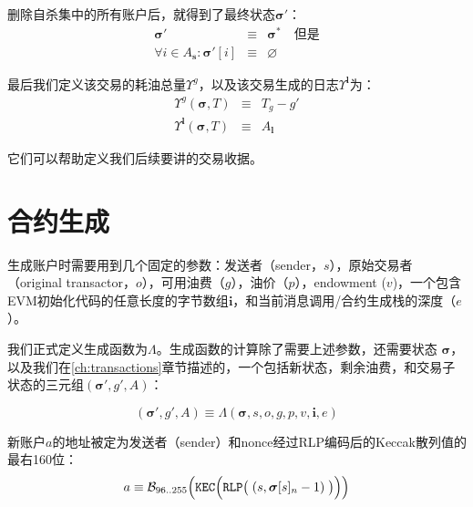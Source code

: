 \documentclass[UTF8,nofonts]{ctexart}
\begin{document}
\begin{multicols}{2}
删除自杀集中的所有账户后，就得到了最终状态$\boldsymbol{\sigma}'$：
\begin{eqnarray}
\boldsymbol{\sigma}' & \equiv & \boldsymbol{\sigma}^* \quad \text{但是} \\
\forall i \in A_\mathbf{s}: \boldsymbol{\sigma}'[i] & \equiv & \varnothing
\end{eqnarray}

最后我们定义该交易的耗油总量$\Upsilon^g$，以及该交易生成的日志$\Upsilon^\mathbf{l}$为：
\begin{eqnarray}
\Upsilon^g(\boldsymbol{\sigma}, T) & \equiv & T_g - g' \\
\Upsilon^\mathbf{l}(\boldsymbol{\sigma}, T) & \equiv & A_\mathbf{l}
\end{eqnarray}

它们可以帮助定义我们后续要讲的交易收据。




\section{合约生成} \label{ch:create}

生成账户时需要用到几个固定的参数：发送者（sender，$s$），原始交易者（original transactor，$o$），可用油费（$g$），油价（$p$），endowment ($v$)，一个包含EVM初始化代码的任意长度的字节数组$\mathbf{i}$，和当前消息调用/合约生成栈的深度（$e$）。

我们正式定义生成函数为$\Lambda$。生成函数的计算除了需要上述参数，还需要状态 $\boldsymbol{\sigma}$，以及我们在\ref{ch:transactions}章节描述的，一个包括新状态，剩余油费，和交易子状态的三元组$(\boldsymbol{\sigma}', g', A)$：

\begin{equation}
(\boldsymbol{\sigma}', g', A) \equiv \Lambda(\boldsymbol{\sigma}, s, o, g, p, v, \mathbf{i}, e)
\end{equation}

新账户$a$的地址被定为发送者（sender）和nonce经过RLP编码后的Keccak散列值的最右160位：
\begin{equation}
a \equiv \mathcal{B}_{96..255}\Big(\mathtt{\tiny KEC}\Big(\mathtt{\tiny RLP}\big(\;(s, \boldsymbol{\sigma}[s]_n - 1)\;\big)\Big)\Big)
\end{equation}


\end{multicols}
\end{document}
